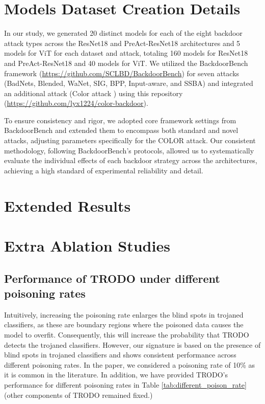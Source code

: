 \section{Models Dataset Creation Details}
\label{appendix:ModelsDatasetCreationDetails}
In our study, we generated 20 distinct models for each of the eight backdoor attack types across the ResNet18 and PreAct-ResNet18 architectures and 5 models for ViT for each dataset and attack, totaling 160 models for ResNet18 and PreAct-ResNet18 and 40 models for ViT. We utilized the BackdoorBench framework \cite{wu2022backdoorbench} (\url{https://github.com/SCLBD/BackdoorBench}) for seven attacks (BadNets, Blended, WaNet, SIG, BPP, Input-aware, and SSBA) and integrated an additional attack (Color attack \cite{color}) using this repository (\url{https://github.com/lyx1224/color-backdoor}).

To ensure consistency and rigor, we adopted core framework settings from BackdoorBench and extended them to encompass both standard and novel attacks, adjusting parameters specifically for the COLOR attack. Our consistent methodology, following BackdoorBench’s protocols, allowed us to systematically evaluate the individual effects of each backdoor strategy across the architectures, achieving a high standard of experimental reliability and detail.



\section{Extended Results}
\label{app:more_results}





\newpage

\section{Extra Ablation Studies}
\label{appendix:extra_ablation_studies}

\subsection{Performance of TRODO under different poisoning rates}
Intuitively, increasing the poisoning rate enlarges the blind spots in trojaned classifiers, as these are boundary regions where the poisoned data causes the model to overfit. Consequently, this will increase the probability that TRODO detects the trojaned classifiers. However, our signature is based on the presence of blind spots in trojaned classifiers and shows consistent performance across different poisoning rates. In the paper, we considered a poisoning rate of 10\% as it is common in the literature. In addition, we have provided TRODO's performance for different poisoning rates in Table \ref{tab:different_poison_rate} (other components of TRODO remained fixed.)

